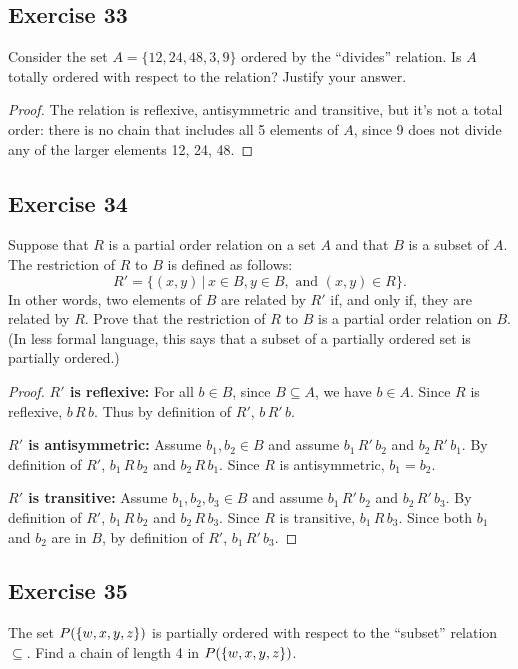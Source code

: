\documentclass[14pt]{extarticle}
\let\mathscr\relax
\newcommand{\ps}{\mathscr{P}} %
\begin{document}
\subsection{Exercise 33}
Consider the set \(A = \{12, 24, 48, 3, 9\}\) ordered by the “divides” relation. Is $A$ totally ordered with respect
to the relation? Justify your answer.

\begin{proof}
        The relation is reflexive, antisymmetric and transitive, but it's not a total order: there is no chain that includes
        all 5 elements of $A$, since 9 does not divide any of the larger elements 12, 24, 48.
\end{proof}

\subsection{Exercise 34}
Suppose that $R$ is a partial order relation on a set $A$ and that $B$ is a subset of $A$. The restriction of $R$ to
$B$ is defined as follows:
\[
        R' = \{(x,y)\,|\,x\in B, y \in B, \text{ and } (x, y) \in R\}.
\]
In other words, two elements of $B$ are related by $R'$ if, and only if, they are related by $R$. Prove that the
restriction of $R$ to $B$ is a partial order relation on $B$. (In less formal language, this says that a subset of a
partially ordered set is partially ordered.)

\begin{proof}
        {\bf $R'$ is reflexive:} For all \(b \in B\), since \(B \subseteq A\), we have \(b \in A\). Since $R$ is reflexive,
        \(b \,R\, b\). Thus by definition of $R'$, \(b \,R'\, b\).

                {\bf $R'$ is antisymmetric:} Assume \(b_1, b_2 \in B\) and assume \(b_1 \,R'\, b_2\) and \(b_2 \,R'\, b_1\). By
        definition of $R'$, \(b_1 \,R\, b_2\) and \(b_2 \,R\, b_1\). Since $R$ is antisymmetric, \(b_1 = b_2\).

                {\bf $R'$ is transitive:} Assume \(b_1, b_2, b_3 \in B\) and assume \(b_1 \,R'\, b_2\) and \(b_2 \,R'\, b_3\). By
        definition of $R'$, \(b_1 \,R\, b_2\) and \(b_2 \,R\, b_3\). Since $R$ is transitive, \(b_1 \,R\, b_3\). Since
        both \(b_1\) and \(b_2\) are in $B$, by definition of $R'$, \(b_1 \,R'\, b_3\).
\end{proof}

\subsection{Exercise 35}
The set \(\ps(\{w, x, y, z\})\) is partially ordered with respect to the “subset” relation \(\subseteq\). Find a
chain of length 4 in \(\ps(\{w, x, y, z\})\).
\end{document}
